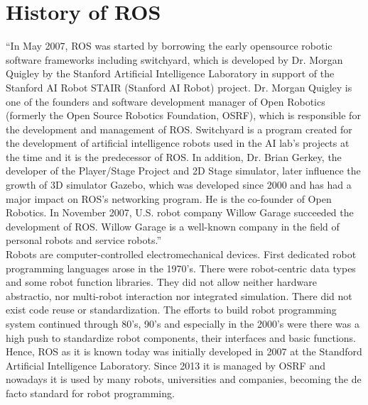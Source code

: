 \section{History of ROS}
“In May 2007, ROS was started by borrowing the early opensource robotic software frameworks including switchyard, which is developed by Dr. Morgan Quigley by the Stanford Artificial Intelligence Laboratory in support of the Stanford AI Robot STAIR (Stanford AI Robot) project.
Dr. Morgan Quigley is one of the founders and software development manager of Open Robotics (formerly the Open Source Robotics Foundation, OSRF), which is responsible for the development and management of ROS.
Switchyard is a program created for the development of artificial intelligence robots used in the AI lab’s projects at the time and it is the predecessor of ROS.
In addition, Dr. Brian Gerkey, the developer of the Player/Stage Project and 2D Stage simulator, later influence the growth of 3D simulator Gazebo, which was developed since 2000 and has had a major impact on ROS’s networking program. He is the co-founder of Open Robotics.
In November 2007, U.S. robot company Willow Garage succeeded the development of ROS. Willow Garage is a well-known company in the field of personal robots and service robots.” \cite{Quigley15}\\
Robots are computer-controlled electromechanical devices.
First dedicated robot programming languages arose in the 1970's.
There were robot-centric data types and some robot function libraries. They did not allow neither hardware abstractio, nor multi-robot interaction nor integrated simulation. There did not exist code reuse or standardization.
The efforts to build robot programming system continued through 80's, 90's and especially in the 2000's were there was a high push to standardize robot components, their interfaces and basic functions.\\
Hence, ROS as it is known today was initially developed in 2007 at the Standford Artificial Intelligence Laboratory. Since 2013 it is managed by OSRF and nowadays it is used by many robots, universities and companies, becoming the de facto standard for robot programming.

